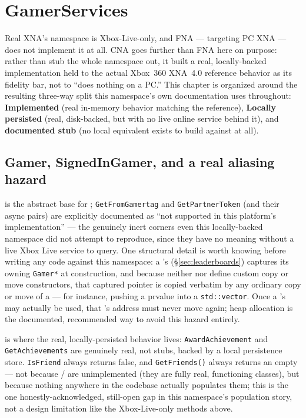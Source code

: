 \chapter{GamerServices}
\label{ch:gamerservices}

Real XNA's  namespace is Xbox-Live-only, and FNA --- targeting PC XNA
--- does not implement it at all. CNA goes further than FNA here on purpose: rather than
stub the whole namespace out, it built a real, locally-backed implementation held to the
actual Xbox~360 XNA~4.0 reference behavior as its fidelity bar, not to ``does nothing on a
PC.'' This chapter is organized around the resulting three-way split this namespace's own
documentation uses throughout: \textbf{Implemented} (real in-memory behavior matching the
reference), \textbf{Locally persisted} (real, disk-backed, but with no live online service
behind it), and \textbf{documented stub} (no local equivalent exists to build against at
all).

\section{Gamer, SignedInGamer, and a real aliasing hazard}

 is the abstract base for ; \texttt{GetFromGamertag}
and \texttt{GetPartnerToken} (and their async pairs) are explicitly documented as ``not
supported in this platform's implementation'' --- the genuinely inert corners even this
locally-backed namespace did not attempt to reproduce, since they have no meaning without a
live Xbox Live service to query. One structural detail is worth knowing before writing any
code against this namespace: a 's 
(\S\ref{sec:leaderboards}) captures its owning \texttt{Gamer*} at construction, and because
neither  nor  define custom copy or move
constructors, that captured pointer is copied verbatim by any ordinary copy or move of a
 --- for instance, pushing a prvalue into a \texttt{std::vector}. Once a
's  may actually be used, that 's
address must never move again; heap allocation is the documented, recommended way to avoid
this hazard entirely.

 is where the real, locally-persisted behavior lives:
\texttt{AwardAchievement} and \texttt{GetAchievements} are genuinely real, not stubs, backed
by a local persistence store. \texttt{IsFriend} always returns false, and
\texttt{GetFriends()} always returns an empty  --- not because
/ are unimplemented (they are fully real,
functioning classes), but because nothing anywhere in the codebase actually populates them;
this is the one honestly-acknowledged, still-open gap in this namespace's population story,
not a design limitation like the Xbox-Live-only methods above.

